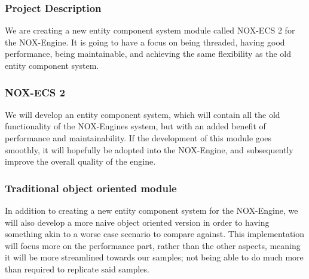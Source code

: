 \subsubsection{Project Description}
We are creating a new entity component system module called NOX-ECS 2 for the NOX-Engine. 
It is going to have a focus on being threaded, having good performance, being maintainable, and achieving the same flexibility as the old entity component system.

\subsubsection*{NOX-ECS 2}
We will develop an entity component system, which will contain all the old functionality of the NOX-Engines system, but with an added benefit of performance and maintainability. 
If the development of this module goes smoothly, it will hopefully be adopted into the NOX-Engine, and subsequently improve the overall quality of the engine.

\subsubsection*{Traditional object oriented module}
In addition to creating a new entity component system for the NOX-Engine, we will also develop a more naive object oriented version in order to having something akin to a worse case scenario to compare against. 
This implementation will focus more on the performance part, rather than the other aspects, meaning it will be more streamlined towards our samples; 
not being able to do much more than required to replicate said samples.